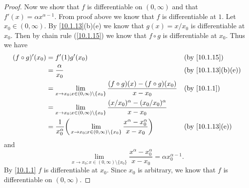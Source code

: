 \begin{proof}
  Now we show that \(f\) is differentiable on \((0, \infty)\) and that \(f'(x) = \alpha x^{\alpha - 1}\).
  From proof above we know that \(f\) is differentiable at \(1\).
  Let \(x_0 \in (0, \infty)\).
  By \cref{10.1.13}(b)(e) we know that \(g(x) = x / x_0\) is differentiable at \(x_0\).
  Then by chain rule (\cref{10.1.15}) we know that \(f \circ g\) is differentiable at \(x_0\).
  Thus we have
  \begin{align*}
    (f \circ g)'(x_0) & = f'(1) g'(x_0)                                                                                                                         &  & \text{(by \cref{10.1.15})}       \\
                      & = \dfrac{\alpha}{x_0}                                                                                                                   &  & \text{(by \cref{10.1.13}(b)(e))} \\
                      & = \lim_{x \to x_0 ; x \in (0, \infty) \setminus \{x_0\}} \dfrac{(f \circ g)(x) - (f \circ g)(x_0)}{x - x_0}                             &  & \text{(by \cref{10.1.1})}        \\
                      & = \lim_{x \to x_0 ; x \in (0, \infty) \setminus \{x_0\}} \dfrac{(x / x_0)^{\alpha} - (x_0 / x_0)^{\alpha}}{x - x_0}                                                           \\
                      & = \dfrac{1}{x_0^{\alpha}} \bigg(\lim_{x \to x_0 ; x \in (0, \infty) \setminus \{x_0\}} \dfrac{x^{\alpha} - x_0^{\alpha}}{x - x_0}\bigg) &  & \text{(by \cref{10.1.13}(e))}
  \end{align*}
  and
  \[
    \lim_{x \to x_0 ; x \in (0, \infty) \setminus \{x_0\}} \dfrac{x^{\alpha} - x_0^{\alpha}}{x - x_0} = \alpha x_0^{\alpha - 1}.
  \]
  By \cref{10.1.1} \(f\) is differentiable at \(x_0\).
  Since \(x_0\) is arbitrary, we know that \(f\) is differentiable on \((0, \infty)\).
\end{proof}